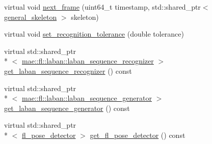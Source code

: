 \begin{DoxyCompactItemize}
\item 
virtual void \hyperlink{classmae_1_1fl_1_1fl__movement__controller_a5755257514da363508ec487cb0ae13fb}{next\-\_\-frame} (uint64\-\_\-t timestamp, std\-::shared\-\_\-ptr$<$ \hyperlink{classmae_1_1general__skeleton}{general\-\_\-skeleton} $>$ skeleton)
\item 
virtual void \hyperlink{classmae_1_1fl_1_1fl__movement__controller_a0bdd94f763b740c612475df629dc3bcf}{set\-\_\-recognition\-\_\-tolerance} (double tolerance)
\item 
virtual std\-::shared\-\_\-ptr\\*
$<$ \hyperlink{classmae_1_1fl_1_1laban_1_1laban__sequence__recognizer}{mae\-::fl\-::laban\-::laban\-\_\-sequence\-\_\-recognizer} $>$ \hyperlink{classmae_1_1fl_1_1fl__movement__controller_abaacf2be62b0194ee6ffcac844a09d22}{get\-\_\-laban\-\_\-sequence\-\_\-recognizer} () const 
\item 
virtual std\-::shared\-\_\-ptr\\*
$<$ \hyperlink{classmae_1_1fl_1_1laban_1_1laban__sequence__generator}{mae\-::fl\-::laban\-::laban\-\_\-sequence\-\_\-generator} $>$ \hyperlink{classmae_1_1fl_1_1fl__movement__controller_a4f4390073c34aa18b55a57c447c84542}{get\-\_\-laban\-\_\-sequence\-\_\-generator} () const 
\item 
virtual std\-::shared\-\_\-ptr\\*
$<$ \hyperlink{classmae_1_1fl_1_1fl__pose__detector}{fl\-\_\-pose\-\_\-detector} $>$ \hyperlink{classmae_1_1fl_1_1fl__movement__controller_a0d25a3e53c47e1cb1f0eb3cd7df07548}{get\-\_\-fl\-\_\-pose\-\_\-detector} () const 
\end{DoxyCompactItemize}


